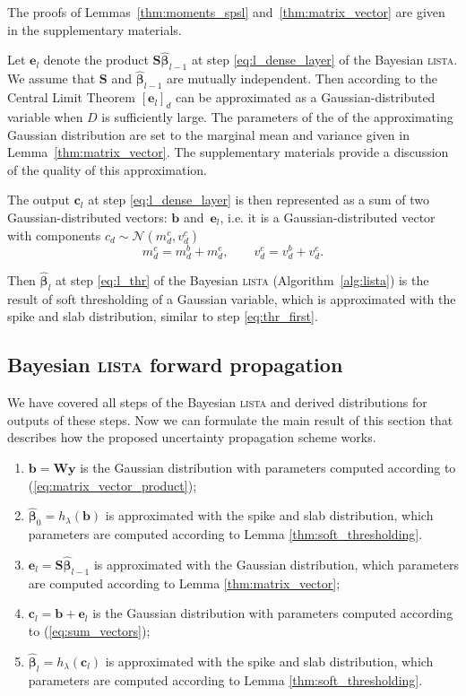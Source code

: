 \documentclass{article}
\begin{document}
The proofs of Lemmas~\ref{thm:moments_spsl} and~\ref{thm:matrix_vector} are given in the supplementary materials.

Let $\mathbf{e}_l$ denote the product $\mathbf{S}\widehat{\boldsymbol\beta}_{l-1}$ at step \ref{eq:l_dense_layer} of the Bayesian \textsc{lista}. We assume that $\mathbf{S}$ and $\widehat{\boldsymbol\beta}_{l-1}$ are mutually independent. Then according to the Central Limit Theorem $[ \mathbf{e}_l ]_d$ can be approximated as a Gaussian-distributed variable when $D$ is sufficiently large. The parameters of the of the approximating Gaussian distribution are set to the marginal mean and variance given in Lemma~\ref{thm:matrix_vector}. The supplementary materials provide a discussion of the quality of this approximation.

The output $\mathbf{c}_l$ at step \ref{eq:l_dense_layer} is then represented as a sum of two Gaussian-distributed vectors: $\mathbf{b}$ and~$\mathbf{e}_l$, i.e. it is a Gaussian-distributed vector with components $c_{d} \sim \mathcal{N}(m^c_{d}, v^c_{d})$
\begin{equation}
\label{eq:sum_vectors}
m^c_{d} = m^b_{d} + m^e_{d}, \qquad
v^c_{d} = v^b_{d} + v^e_{d}.
\end{equation}


Then $\widehat{\boldsymbol\beta}_{l}$ at step \ref{eq:l_thr} of the Bayesian \textsc{lista} (Algorithm~\ref{alg:lista}) is the result of soft thresholding of a Gaussian variable, which is approximated with the spike and slab distribution,  similar to step \ref{eq:thr_first}.

\subsection{Bayesian \textsc{lista} forward propagation}
We have covered all steps of the Bayesian \textsc{lista} and derived distributions for outputs of these steps. Now we can formulate the main result of this section that describes how the proposed uncertainty propagation scheme works.

\begin{enumerate}
	\item $\mathbf{b} = \mathbf{W}\mathbf{y}$ is the Gaussian distribution with parameters computed according to (\ref{eq:matrix_vector_product});
	\item $\widehat{\boldsymbol\beta}_{0} = h_\lambda(\mathbf{b})$ is approximated with the spike and slab distribution, which parameters are computed according to Lemma \ref{thm:soft_thresholding}.
	\item $\mathbf{e}_l = \mathbf{S}\widehat{\boldsymbol\beta}_{l-1}$ is approximated with the Gaussian distribution, which parameters are computed according to Lemma \ref{thm:matrix_vector};
	\item $\mathbf{c}_l = \mathbf{b} + \mathbf{e}_l$ is the Gaussian distribution with parameters computed according to (\ref{eq:sum_vectors});
	\item $\widehat{\boldsymbol\beta}_{l} = h_\lambda(\mathbf{c}_l)$ is approximated with the spike and slab distribution, which parameters are computed according to Lemma \ref{thm:soft_thresholding}.
\end{enumerate}
\end{document}
